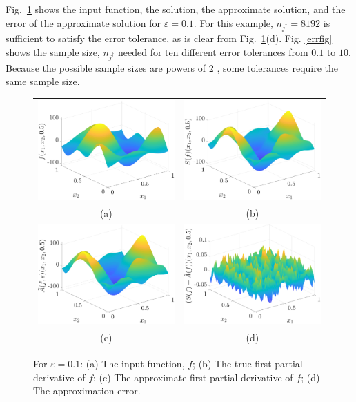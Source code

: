 \documentclass[graybox,footinfo]{svmult}
\begin{document}
Fig.\ \ref{solfig} shows the input function, the solution, the approximate solution, and the error of the approximate solution for $\varepsilon = 0.1$.  For this example, $ n_{j^\dagger} = 8192$ is sufficient to satisfy the error tolerance, as is clear from Fig.\ \ref{solfig}(d).  Fig. \ref{errfig} shows the sample size, $n_{j^\dagger}$ needed for ten different error tolerances from $0.1$ to $10$. Because the possible sample sizes are powers of $2$ , some tolerances require the same sample size.

\begin{figure}[ht]
	\centering
	\begin{tabular}{cc}
		\includegraphics[width =5.5 cm]{ProgramsImages/SimFourCoefInpFun.eps} &
		\includegraphics[width = 5.5 cm]{ProgramsImages/SimFourCoefSol.eps}
		\\ (a) & (b) \\
		\includegraphics[width =5.5 cm]{ProgramsImages/SimDirectSolAppx.eps} &
		\includegraphics[width = 5.5 cm]{ProgramsImages/SimDirectSolErr.eps}
		\\ (c) & (d)
	\end{tabular}
	\caption{For $\varepsilon = 0.1$:  (a) The input function, $f$; (b) The true first partial derivative of $f$; (c) The approximate first partial derivative of $f$; 
		(d) The approximation error.
		\label{solfig}} %
\end{figure}
\end{document}
